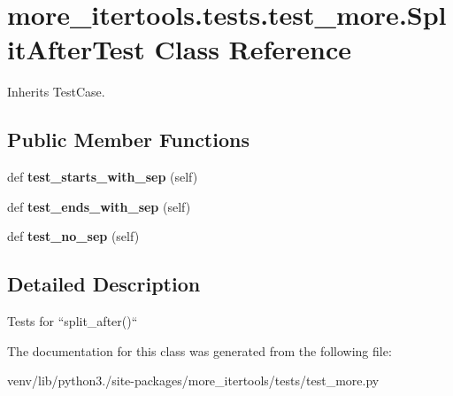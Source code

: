 \hypertarget{classmore__itertools_1_1tests_1_1test__more_1_1_split_after_test}{}\section{more\+\_\+itertools.\+tests.\+test\+\_\+more.\+Split\+After\+Test Class Reference}
\label{classmore__itertools_1_1tests_1_1test__more_1_1_split_after_test}


Inherits Test\+Case.

\subsection*{Public Member Functions}
\begin{DoxyCompactItemize}
\item 
\mbox{\label{classmore__itertools_1_1tests_1_1test__more_1_1_split_after_test_ae144e988de8655d7834133c2f4de2858}} 
def {\bfseries test\+\_\+starts\+\_\+with\+\_\+sep} (self)
\item 
\mbox{\label{classmore__itertools_1_1tests_1_1test__more_1_1_split_after_test_a642e79b1eeeb973ee5a7ebd01c039b2c}} 
def {\bfseries test\+\_\+ends\+\_\+with\+\_\+sep} (self)
\item 
\mbox{\label{classmore__itertools_1_1tests_1_1test__more_1_1_split_after_test_ae4827bfd2fd5c397e33d362efdc22651}} 
def {\bfseries test\+\_\+no\+\_\+sep} (self)
\end{DoxyCompactItemize}


\subsection{Detailed Description}
\begin{DoxyVerb}Tests for ``split_after()``\end{DoxyVerb}
 

The documentation for this class was generated from the following file\+:\begin{DoxyCompactItemize}
\item 
venv/lib/python3./site-\/packages/more\+\_\+itertools/tests/test\+\_\+more.\+py\end{DoxyCompactItemize}
